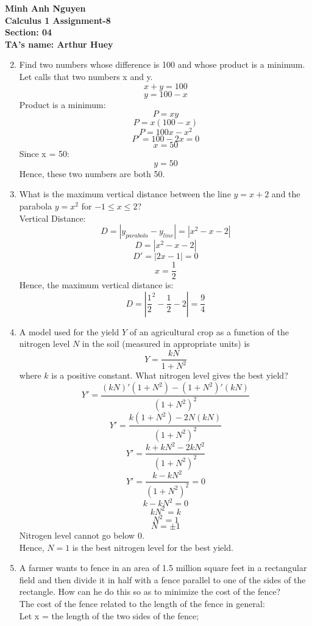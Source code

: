 \documentclass[12pt]{article}
\begin{document}
\textbf{Minh Anh Nguyen }\\
\textbf{Calculus 1 Assignment-8}\\
\textbf{Section: 04}\\
\textbf{TA's name: Arthur Huey}

\hrulefill

\begin{enumerate}
\setcounter{enumi}{1}
    \item Find two numbers whose difference is 100 and whose product is a minimum.\\
    Let calls that two numbers x and y.
    \[x + y = 100\]
    \[y = 100 - x\]
    Product is a minimum:
    \[P = xy\]
    \[P = x(100-x)\]
    \[P = 100x - x^2\]
    \[P' = 100 - 2x = 0\]
    \[x = 50\]
    Since x = 50:
    \[y = 50\]
    Hence, these two numbers are both 50.
    \setcounter{enumi}{4}
    \item What is the maximum vertical distance between the line \(y=x+2\) and the parabola \(y=x^2\) for $-1 \leq x \leq 2$?\\
    Vertical Distance:
    \[D = |y_{parabola} - y_{line}| = |x^2-x-2|\]
    \[D = |x^2-x-2|\]
    \[D' = |2x-1| = 0\]
    \[x = \frac{1}{2}\]
    Hence, the maximum vertical distance is:
    \[D = |\frac{1}{2}^2 - \frac{1}{2} - 2| =  \frac{9}{4}\]
    \setcounter{enumi}{8}
    \item A model used for the yield $Y$ of an agricultural crop as a function of the nitrogen level $N$ in the soil (measured in appropriate units) is
    \[Y = \frac{kN}{1+N^2}\]
    where $k$ is a positive constant. What nitrogen level gives the best yield?
    \[Y' = \frac{(kN)'(1+N^2) - (1+N^2)'(kN)}{(1+N^2)^2}\]
    \[Y' = \frac{k(1+N^2) - 2N(kN)}{(1+N^2)^2}\]
    \[Y' = \frac{k+kN^2 - 2kN^2}{(1+N^2)^2}\]
    \[Y' = \frac{k -kN^2}{(1+N^2)^2} = 0\]
    \[k-kN^2 = 0\]
    \[kN^2 = k\]
    \[N^2 = 1\]
    \[N = \pm 1\]
    Nitrogen level cannot go below 0.\\
    Hence, $N = 1$ is the best nitrogen level for the best yield.
    \setcounter{enumi}{12}
    \item A farmer wants to fence in an area of 1.5 million square feet in a rectangular field and then divide it in half with a fence parallel to one of the sides of the rectangle. How can he do this so as to minimize the cost of the fence?\\
    The cost of the fence related to the length of the fence in general:\\
    Let x = the length of the two sides of the fence;\\

\end{enumerate}
\end{document}
